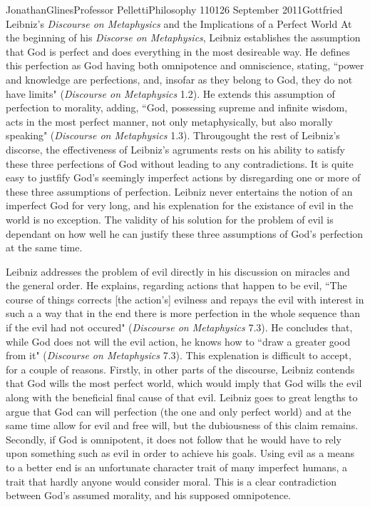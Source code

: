 \documentclass[12pt,letterpaper]{article}
\begin{document}
\begin{mla}{Jonathan}{Glines}{Professor Pelletti}{Philosophy 1101}{26 September 2011}{Gottfried Leibniz's \textit{Discourse on Metaphysics} and the Implications of a Perfect World}
At the beginning of his \textit{Discorse on Metaphysics}, Leibniz establishes the assumption that God is perfect and does everything in the most desireable way. He defines this perfection as God having both omnipotence and omniscience, stating, ``power and knowledge are perfections, and, insofar as they belong to God, they do not have limits" (\textit{Discourse on Metaphysics} 1.2). He extends this assumption of perfection to morality, adding, ``God, possessing supreme and infinite wisdom, acts in the most perfect manner, not only metaphysically, but also morally speaking" (\textit{Discourse on Metaphysics} 1.3). Througought the rest of Leibniz's discorse, the effectiveness of Leibniz's agruments rests on his ability to satisfy these three perfections of God without leading to any contradictions. It is quite easy to justfify God's seemingly imperfect actions by disregarding one or more of these three assumptions of perfection. Leibniz never entertains the notion of an imperfect God for very long, and his explenation for the existance of evil in the world is no exception. The validity of his solution for the problem of evil is dependant on how well he can justify these three assumptions of God's perfection at the same time.

Leibniz addresses the problem of evil directly in his discussion on miracles and the general order. He explains, regarding actions that happen to be evil, ``The course of things corrects [the action's] evilness and repays the evil with interest in such a a way that in the end there is more perfection in the whole sequence than if the evil had not occured" (\textit{Discourse on Metaphysics} 7.3). He concludes that, while God does not will the evil action, he knows how to ``draw a greater good from it" (\textit{Discourse on Metaphysics} 7.3). This explenation is difficult to accept, for a couple of reasons. Firstly, in other parts of the discourse, Leibniz contends that God wills the most perfect world, which would imply that God wills the evil along with the beneficial final cause of that evil. Leibniz goes to great lengths to argue that God can will perfection (the one and only perfect world) and at the same time allow for evil and free will, but the dubiousness of this claim remains. Secondly, if God is omnipotent, it does not follow that he would have to rely upon something such as evil in order to achieve his goals. Using evil as a means to a better end is an unfortunate character trait of many imperfect humans, a trait that hardly anyone would consider moral. This is a clear contradiction between God's assumed morality, and his supposed omnipotence.


\end{mla}
\end{document}
